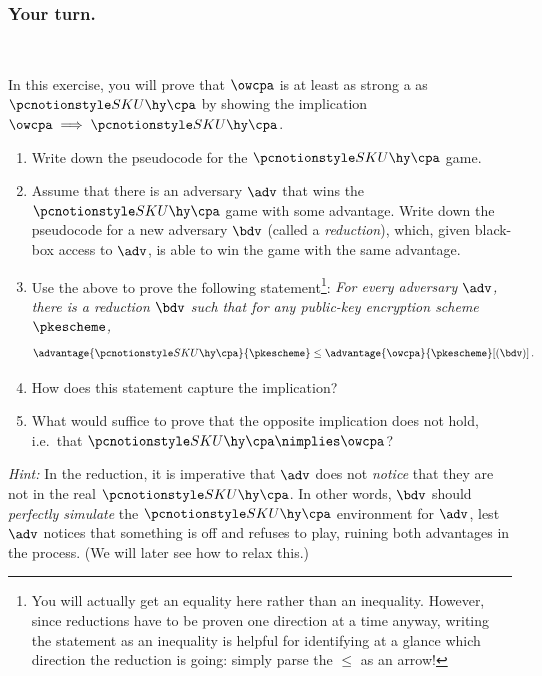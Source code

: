 	\subsubsection{Your turn.}
	
	\
    \begin{exercise}
      In this exercise, you will prove that $\owcpa$ is at least as strong a
      as $\skucpa$ by showing the implication $\owcpa \implies \skucpa$.
      \begin{enumerate}[label=\alph*)]
        \item Write down the pseudocode for the $\skucpa$ game.
        \item Assume that there is an adversary $\adv$ that wins the $\skucpa$
          game with some advantage.
          Write down the pseudocode for a new adversary $\bdv$ (called a
          \emph{reduction}), which, given black-box access to $\adv$,
          is able to win the \owcpa game with the same advantage.
        \item Use the above to prove the following statement\footnote{
            You will actually get an equality here rather than an inequality.
            However, since reductions have to be proven one direction
            at a time anyway, writing the statement as an inequality is helpful
            for identifying at a glance which direction the reduction is
            going: simply parse the $\leq$ as an arrow!
          }: \emph{For every adversary $\adv$, there is a reduction $\bdv$
          such that for any public-key encryption scheme $\pkescheme$,}
          \[
            \advantage{\skucpa}{\pkescheme} \leq
            \advantage{\owcpa}{\pkescheme}[(\bdv)]\, .
          \]
        \item How does this statement capture the implication?
        \item What would suffice to prove that the opposite implication does
          not hold, i.e.\ that $\skucpa \nimplies \owcpa$?
      \end{enumerate}
      \emph{Hint:} In the reduction, it is imperative that $\adv$ does not \emph{notice} that
        they are not in the real $\skucpa$. In other words,
        $\bdv$ should \emph{perfectly simulate} the $\skucpa$ environment for
        $\adv$, lest $\adv$ notices that something is off and refuses to play, ruining
        both advantages in the process.
        (We will later see how to relax this.)
    \end{exercise}

